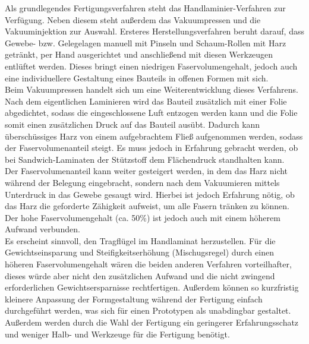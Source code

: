 \noindent Als grundlegendes Fertigungsverfahren steht das Handlaminier-Verfahren zur Verfügung. Neben diesem steht außerdem das Vakuumpressen und die Vakuuminjektion zur Auswahl. Ersteres Herstellungsverfahren beruht darauf, dass Gewebe- bzw. Gelegelagen  manuell mit Pinseln und Schaum-Rollen mit Harz getränkt, per Hand ausgerichtet und anschließend mit diesen Werkzeugen entlüftet werden. Dieses bringt einen niedrigen Faservolumengehalt, jedoch auch eine individuellere Gestaltung eines Bauteils in offenen Formen mit sich. \\
Beim Vakuumpressen handelt sich um eine Weiterentwicklung dieses Verfahrens. Nach dem eigentlichen Laminieren wird das Bauteil zusätzlich mit einer Folie abgedichtet, sodass die eingeschlossene Luft entzogen werden kann und die Folie somit einen zusätzlichen Druck auf das Bauteil ausübt. Dadurch kann überschüssiges Harz von einem aufgebrachtem Fließ aufgenommen werden, sodass der Faservolumenanteil steigt. Es muss jedoch in Erfahrung gebracht werden, ob bei Sandwich-Laminaten der Stützstoff dem Flächendruck standhalten kann.\\
Der Faservolumenanteil kann weiter gesteigert werden, in dem das Harz nicht während der Belegung eingebracht, sondern nach dem Vakuumieren mittels Unterdruck in das Gewebe gesaugt wird. Hierbei ist jedoch Erfahrung nötig, ob das Harz die geforderte Zähigkeit aufweist, um alle Fasern tränken zu können. Der hohe Faservolumengehalt (ca. 50\%) ist jedoch auch mit einem höherem Aufwand verbunden.\\

\noindent Es erscheint sinnvoll, den Tragflügel im Handlaminat herzustellen. Für die Gewichtseinsparung und Steifigkeitserhöhung (Mischugsregel) durch einen höheren Faservolumengehalt wären die beiden anderen Verfahren vorteilhafter, dieses würde aber nicht den zusätzlichen Aufwand und die nicht zwingend erforderlichen Gewichtsersparnisse rechtfertigen. Außerdem können so kurzfristig kleinere Anpassung der Formgestaltung während der Fertigung einfach durchgeführt werden, was sich für einen Prototypen als unabdingbar gestaltet. Außerdem werden durch die Wahl der Fertigung ein geringerer Erfahrungsschatz und weniger Halb- und Werkzeuge für die Fertigung benötigt.